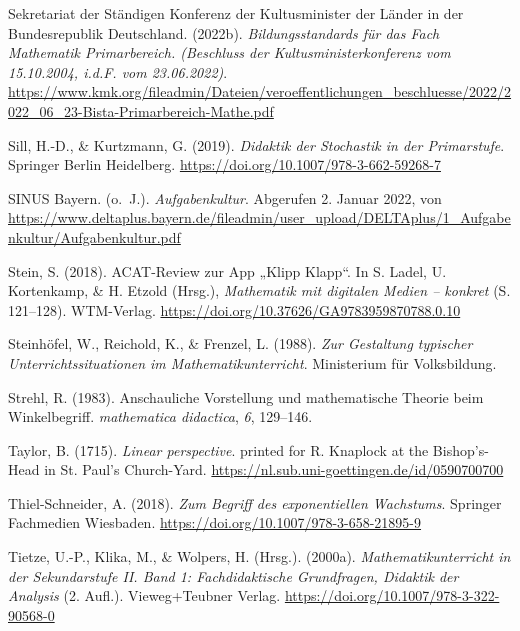 \documentclass[
]{scrbook}
\newlength{\cslhangindent}
\newlength{\cslentryspacingunit} %
\newenvironment{CSLReferences}[2] %
 {%
  \setlength{\parindent}{0pt}
  \ifodd #1
  \let\oldpar\par
  \def\par{\hangindent=\cslhangindent\oldpar}
  \fi
  \setlength{\parskip}{#2\cslentryspacingunit}
 }%
 {}
\theoremstyle{definition}
\theoremstyle{definition}
\theoremstyle{definition}
\theoremstyle{definition}
\theoremstyle{remark}
\begin{document}
\begin{CSLReferences}{1}{0}
\leavevmode{}%
Sekretariat der Ständigen Konferenz der Kultusminister der Länder in der Bundesrepublik Deutschland. (2022b). \emph{Bildungsstandards für das {Fach} {Mathematik} {Primarbereich}. ({Beschluss} der {Kultusministerkonferenz} vom 15.10.2004, i.d.{F}. vom 23.06.2022)}. \url{https://www.kmk.org/fileadmin/Dateien/veroeffentlichungen_beschluesse/2022/2022_06_23-Bista-Primarbereich-Mathe.pdf}

\leavevmode{}%
Sill, H.-D., \& Kurtzmann, G. (2019). \emph{Didaktik der {Stochastik} in der {Primarstufe}}. Springer Berlin Heidelberg. \url{https://doi.org/10.1007/978-3-662-59268-7}

\leavevmode{}%
SINUS Bayern. (o.~J.). \emph{Aufgabenkultur}. Abgerufen 2. Januar 2022, von \url{https://www.deltaplus.bayern.de/fileadmin/user_upload/DELTAplus/1_Aufgabenkultur/Aufgabenkultur.pdf}

\leavevmode{}%
Stein, S. (2018). {ACAT}-{Review} zur {App} „{Klipp} {Klapp}``. In S. Ladel, U. Kortenkamp, \& H. Etzold (Hrsg.), \emph{Mathematik mit digitalen {Medien} -- konkret} (S. 121--128). WTM-Verlag. \url{https://doi.org/10.37626/GA9783959870788.0.10}

\leavevmode{}%
Steinhöfel, W., Reichold, K., \& Frenzel, L. (1988). \emph{Zur {Gestaltung} typischer {Unterrichtssituationen} im {Mathematikunterricht}}. Ministerium für Volksbildung.

\leavevmode{}%
Strehl, R. (1983). Anschauliche {Vorstellung} und mathematische {Theorie} beim {Winkelbegriff}. \emph{mathematica didactica}, \emph{6}, 129--146.

\leavevmode{}%
Taylor, B. (1715). \emph{Linear perspective}. printed for R. Knaplock at the Bishop's-Head in St. Paul's Church-Yard. \url{https://nl.sub.uni-goettingen.de/id/0590700700}

\leavevmode{}%
Thiel-Schneider, A. (2018). \emph{Zum {Begriff} des exponentiellen {Wachstums}}. Springer Fachmedien Wiesbaden. \url{https://doi.org/10.1007/978-3-658-21895-9}

\leavevmode{}%
Tietze, U.-P., Klika, M., \& Wolpers, H. (Hrsg.). (2000a). \emph{Mathematikunterricht in der {Sekundarstufe} {II}. {Band} 1: {Fachdidaktische} {Grundfragen}, {Didaktik} der {Analysis}} (2. Aufl.). Vieweg+Teubner Verlag. \url{https://doi.org/10.1007/978-3-322-90568-0}


\end{CSLReferences}
\end{document}
